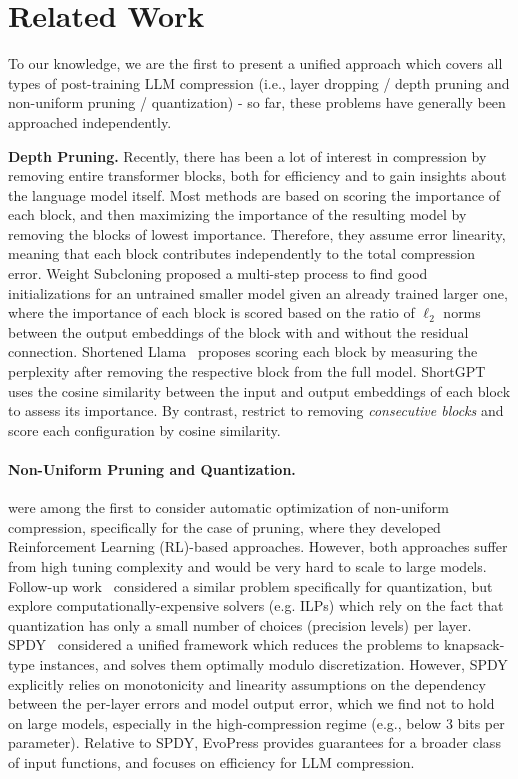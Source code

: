 \documentclass{article}
\theoremstyle{plain}
\theoremstyle{definition}
\theoremstyle{remark}
\newcommand{\methodname}{EvoPress}
\begin{document}
\section{Related Work}
\label{sec:prel_work}

To our knowledge, we are the first to present a unified approach which covers all types of post-training LLM compression (i.e.,  layer dropping / depth pruning and non-uniform pruning / quantization) - so far, these problems have generally been approached independently. 

\textbf{Depth Pruning.} Recently, there has been a lot of interest in compression by removing entire transformer blocks, both for efficiency and to gain insights about the language model itself. Most methods are based on scoring the importance of each block, and then maximizing the importance of the resulting model by removing the blocks of lowest importance. Therefore, they assume error linearity, meaning that each block contributes independently to the total compression error. Weight Subcloning \citep{weight_subcloning} proposed a multi-step process to find good initializations for an untrained smaller model given an already trained larger one, where the importance of each block is scored based on the ratio of $\ell_2$ norms between the output embeddings of the block with and without the residual connection. Shortened Llama~\citep{shortened_llama} proposes scoring each block by measuring the perplexity after removing the respective block from the full model. ShortGPT~\citep{shortgpt} uses the cosine similarity between the input and output embeddings of each block to assess its importance. By contrast, \citet{ineffect_of_deeper} restrict  to removing \emph{consecutive  blocks} and score each configuration by cosine similarity. 

\paragraph{Non-Uniform Pruning and Quantization.} \citet{he2018amc, ashok2018n2n} were among the first to consider automatic optimization of non-uniform compression, specifically for the case of pruning, where they developed Reinforcement Learning (RL)-based approaches. 
However, both approaches suffer from high tuning complexity and would be very hard to scale to large models. Follow-up work~\citep{hubara2021accelerated, yao2021hawq, li2021brecq} considered a similar problem specifically for quantization, but explore computationally-expensive solvers (e.g. ILPs) which rely on the fact that quantization has only a small number of choices (precision levels) per layer. SPDY~\citep{frantar2022spdy} considered a unified framework which reduces the problems to knapsack-type instances, and solves them optimally modulo discretization. 
However, SPDY explicitly relies on monotonicity and linearity assumptions on the dependency between the per-layer errors and model output error, which we find not to hold on large models, especially in the high-compression regime (e.g., below 3 bits per parameter). 
Relative to SPDY, \methodname{} provides guarantees for a broader class of input functions, and focuses on efficiency for LLM compression. 
\end{document}
